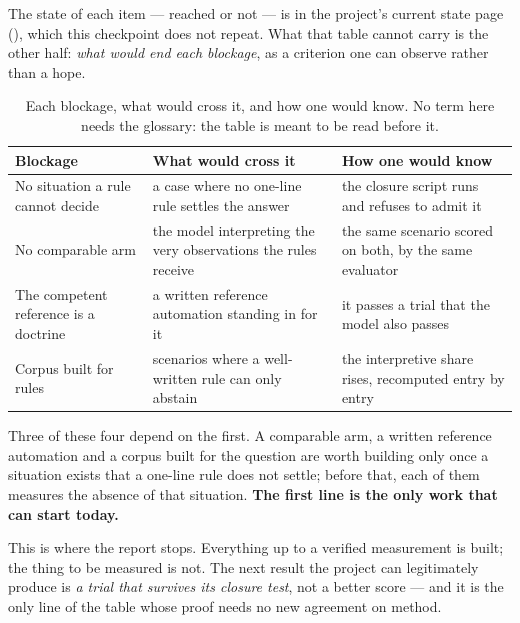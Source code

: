 The state of each item --- reached or not --- is in the project's current state
page (), which this checkpoint does not repeat. What
that table cannot carry is the other half: \emph{what would end each blockage}, as
a criterion one can observe rather than a hope.

\begin{table}[H]
\centering
\caption{Each blockage, what would cross it, and how one would know. No term here
needs the glossary: the table is meant to be read before it.}
\label{tab:jusquou}
\small
\begin{tabularx}{\linewidth}{@{}p{3.4cm}Yp{4.0cm}@{}}
\toprule
Blockage & What would cross it & How one would know \\
\midrule
No situation a rule cannot decide & a case where no one-line rule settles the answer &
the closure script runs and refuses to admit it \\
No comparable arm & the model interpreting the very observations the rules
receive & the same scenario scored on both, by the same evaluator \\
The competent reference is a doctrine & a written reference automation standing in
for it & it passes a trial that the model also passes \\
Corpus built for rules & scenarios where a well-written rule can only abstain &
the interpretive share rises, recomputed entry by entry \\
\bottomrule
\end{tabularx}
\end{table}

Three of these four depend on the first. A comparable arm, a written reference
automation and a corpus built for the question are worth building only once a
situation exists that a one-line rule does not settle; before that, each of them
measures the absence of that situation. \textbf{The first line is the only work that
can start today.}

This is where the report stops. Everything up to a verified measurement is built;
the thing to be measured is not. The next result the project can legitimately
produce is \emph{a trial that survives its closure test}, not a better score ---
and it is the only line of the table whose proof needs no new agreement on method.

\clearpage
